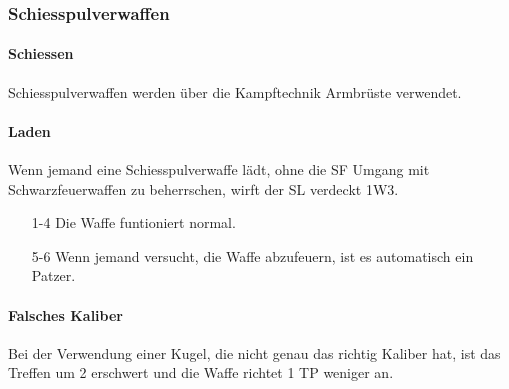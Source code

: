 \documentclass[9pt]{article}
\begin{document}
	\begin{shaded}
		\subsubsection{Schiesspulverwaffen}
		\begin{multicols}{2}
			\paragraph{Schiessen} Schiesspulverwaffen werden über die Kampftechnik Armbrüste verwendet.
			\paragraph{Laden} Wenn jemand eine Schiesspulverwaffe lädt, ohne die SF Umgang mit Schwarzfeuerwaffen zu beherrschen, wirft der SL verdeckt 1W3.
			\begin{itemize}
				\item[1-4] Die Waffe funtioniert normal.
				\item[5-6] Wenn jemand versucht, die Waffe abzufeuern, ist es automatisch ein Patzer.
			\end{itemize}
			\paragraph{Falsches Kaliber} Bei der Verwendung einer Kugel, die nicht genau das richtig Kaliber hat, ist das Treffen um 2 erschwert und die Waffe richtet 1 TP weniger an.

\end{multicols}
\end{shaded}
\end{document}
